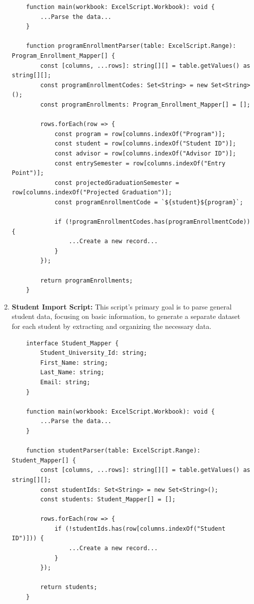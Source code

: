 \documentclass[12pt]{article}
\begin{document}
\begin{enumerate}[label=(\roman*)]
\begin{lstlisting}
    function main(workbook: ExcelScript.Workbook): void {
        ...Parse the data...
    }
    
    function programEnrollmentParser(table: ExcelScript.Range): Program_Enrollment_Mapper[] {
        const [columns, ...rows]: string[][] = table.getValues() as string[][];
        const programEnrollmentCodes: Set<String> = new Set<String>();
        const programEnrollments: Program_Enrollment_Mapper[] = [];
    
        rows.forEach(row => {
            const program = row[columns.indexOf("Program")];
            const student = row[columns.indexOf("Student ID")];
            const advisor = row[columns.indexOf("Advisor ID")];
            const entrySemester = row[columns.indexOf("Entry Point")];
            const projectedGraduationSemester = row[columns.indexOf("Projected Graduation")];
            const programEnrollmentCode = `${student}${program}`;
    
            if (!programEnrollmentCodes.has(programEnrollmentCode)) {
                ...Create a new record...
            }
        });
    
        return programEnrollments;
    }
    \end{lstlisting}

    \item \textbf{Student Import Script:} This script's primary goal is to parse general student data, focusing on basic information, to generate a separate dataset for each student by extracting and organizing the necessary data.
    \begin{lstlisting}
    interface Student_Mapper {
        Student_University_Id: string;
        First_Name: string;
        Last_Name: string;
        Email: string;
    }
    
    function main(workbook: ExcelScript.Workbook): void {
        ...Parse the data...
    }
    
    function studentParser(table: ExcelScript.Range): Student_Mapper[] {
        const [columns, ...rows]: string[][] = table.getValues() as string[][];
        const studentIds: Set<String> = new Set<String>();
        const students: Student_Mapper[] = [];
    
        rows.forEach(row => {
            if (!studentIds.has(row[columns.indexOf("Student ID")])) {
                ...Create a new record...
            }
        });
    
        return students;
    }
    \end{lstlisting}


\end{enumerate}
\end{document}
